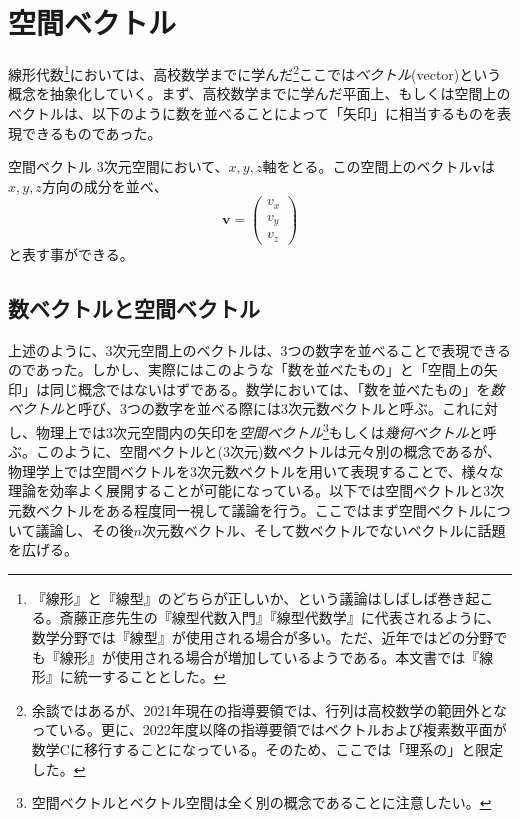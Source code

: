 \section{空間ベクトル}
線形代数\footnote{『線形』と『線型』のどちらが正しいか、という議論はしばしば巻き起こる。斎藤正彦先生の『線型代数入門』『線型代数学』に代表されるように、数学分野では『線型』が使用される場合が多い。ただ、近年ではどの分野でも『線形』が使用される場合が増加しているようである。本文書では『線形』に統一することとした。}においては、高校数学までに学んだ\footnote{余談ではあるが、2021年現在の指導要領では、行列は高校数学の範囲外となっている。更に、2022年度以降の指導要領ではベクトルおよび複素数平面が数学Cに移行することになっている。そのため、ここでは「理系の」と限定した。}ここでは\emph{ベクトル}(vector)という概念を抽象化していく。まず、高校数学までに学んだ平面上、もしくは空間上のベクトルは、以下のように数を並べることによって「矢印」に相当するものを表現できるものであった。
\begin{definition*}{空間ベクトル}
	3次元空間において、\(x,y,z\)軸をとる。この空間上のベクトル\(\boldsymbol{v}\)は\(x,y,z\)方向の成分を並べ、
	\begin{equation}
		\boldsymbol{v}=
		\begin{pmatrix} v_x \\v_y \\ v_z \end{pmatrix}
	\end{equation}
	と表す事ができる。
\end{definition*}
\subsection{数ベクトルと空間ベクトル}
上述のように、3次元空間上のベクトルは、3つの数字を並べることで表現できるのであった。しかし、実際にはこのような「数を並べたもの」と「空間上の矢印」は同じ概念ではないはずである。数学においては、「数を並べたもの」を\emph{数ベクトル}と呼び、3つの数字を並べる際には3次元数ベクトルと呼ぶ。これに対し、物理上では3次元空間内の矢印を\emph{空間ベクトル}\footnote{空間ベクトルとベクトル空間は全く別の概念であることに注意したい。}もしくは\emph{幾何ベクトル}と呼ぶ。このように、空間ベクトルと(3次元)数ベクトルは元々別の概念であるが、物理学上では空間ベクトルを3次元数ベクトルを用いて表現することで、様々な理論を効率よく展開することが可能になっている。以下では空間ベクトルと3次元数ベクトルをある程度同一視して議論を行う。ここではまず空間ベクトルについて議論し、その後\(n\)次元数ベクトル、そして数ベクトルでないベクトルに話題を広げる。

